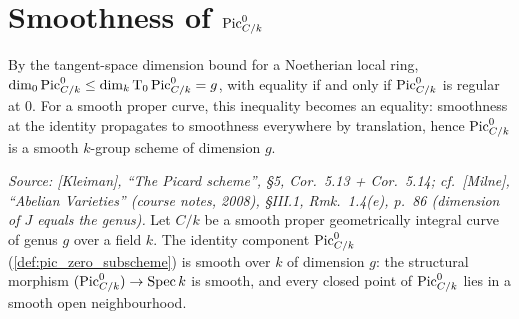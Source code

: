 \section{Smoothness of \(\operatorname{Pic}^0_{C/k}\)}
\label{sec:pic0_smooth}

By the tangent-space dimension bound for a Noetherian local ring,
\(\dim_0 \operatorname{Pic}^0_{C/k} \le \dim_k \textup T_0 \operatorname{Pic}^0_{C/k} = g\), with
equality if and only if \(\operatorname{Pic}^0_{C/k}\) is regular at \(0\). For a
smooth proper curve, this inequality becomes an equality: smoothness
at the identity propagates to smoothness everywhere by
translation, hence \(\operatorname{Pic}^0_{C/k}\) is a smooth \(k\)-group scheme of
dimension \(g\).

\begin{theorem}
  \label{thm:pic0_smooth}

  \textit{Source: [Kleiman], ``The Picard scheme'', \S 5,
  Cor.~5.13 + Cor.~5.14; cf.\ [Milne], ``Abelian Varieties''
  (course notes, 2008), \S III.1, Rmk.~1.4(e), p.~86 (dimension of \(J\)
  equals the genus).}
  Let \(C/k\) be a smooth proper geometrically integral curve of genus
  \(g\) over a field \(k\). The identity component \(\operatorname{Pic}^0_{C/k}\)
  (\cref{def:pic_zero_subscheme}) is smooth over \(k\) of dimension
  \(g\): the structural morphism
  \((\operatorname{Pic}^0_{C/k}) \to \operatorname{Spec} k\) is smooth, and every closed point of
  \(\operatorname{Pic}^0_{C/k}\) lies in a smooth open neighbourhood.
\end{theorem}

